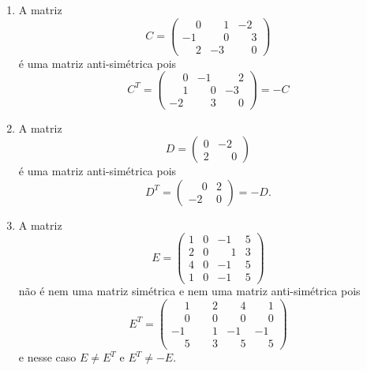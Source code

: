 \begin{exemplos}
\begin{enumerate}[label={\arabic*})]
        \item A matriz
            \[
                C = \begin{pmatrix}
                   \phantom{-} 0 & \phantom{-}1 & -2\\
                    -1 & \phantom{-}0 & \phantom{-}3\\
                    \phantom{-}2 & -3 & \phantom{-}0
                \end{pmatrix}
            \]
            é uma matriz anti-simétrica pois
             \[
                C^T = \begin{pmatrix}
                    \phantom{-}0 & -1 & \phantom{-}2\\
                    \phantom{-}1 & \phantom{-}0 & -3\\
                    -2 & \phantom{-}3 & \phantom{-}0
                \end{pmatrix} = -C
            \]

        \item A matriz
            \[
                D = \begin{pmatrix}
                    0 & -2\\
                    2 & \phantom{-}0
                \end{pmatrix}
            \]
            é uma matriz anti-simétrica pois
            \[
                D^T = \begin{pmatrix}
                    \phantom{-}0 & 2\\
                    -2 & 0
                \end{pmatrix} = -D.
            \]

        \item A matriz
            \[
                E = \begin{pmatrix}
                    1 & 0 & -1 & 5\\
                    2 & 0 & \phantom{-}1 & 3\\
                    4 & 0 & -1 & 5\\
                    1 & 0 & -1 & 5
                \end{pmatrix}
            \]
            não é nem uma matriz simétrica e nem uma matriz anti-simétrica pois
            \[
                E^T = \begin{pmatrix}
                    \phantom{-}1 & \phantom{-}2 & \phantom{-}4 & \phantom{-}1\\
                    \phantom{-}0 & \phantom{-}0 & \phantom{-}0 & \phantom{-}0\\
                    -1 & \phantom{-}1 & -1 & -1\\
                    \phantom{-}5 & \phantom{-}3 & \phantom{-}5 & \phantom{-}5
                \end{pmatrix}
            \]
            e nesse caso $E \ne E^T$ e $E^T  \ne -E$.
    \end{enumerate}
\end{exemplos}


